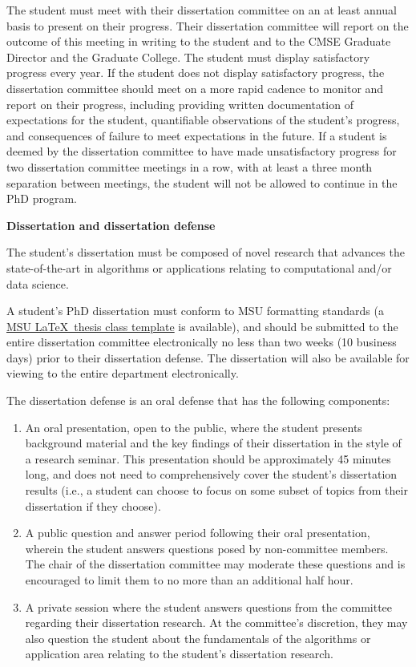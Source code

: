 The student must meet with their dissertation committee on an at least
annual basis to present on their progress.  Their dissertation
committee will report on the outcome of this meeting in writing to the
student and to the CMSE Graduate Director and the Graduate College.
The student must display satisfactory progress every year.  If the
student does not display satisfactory progress, the dissertation
committee should meet on a more rapid cadence to monitor and report on
their progress, including providing written documentation of
expectations for the student, quantifiable observations of the
student's progress, and consequences of failure to meet expectations
in the future.  If a student is deemed by the dissertation committee
to have made unsatisfactory progress for two dissertation committee
meetings in a row, with at least a three month separation between
meetings, the student will not be allowed to continue in the PhD
program.

\vspace{3mm}
\noindent
\textbf{Dissertation and dissertation defense}

The student's dissertation must be composed of novel research that
advances the state-of-the-art in algorithms or applications relating
to computational and/or data science.

A student's PhD dissertation must conform to MSU formatting standards
(a \href{http://ctan.org/pkg/msu-thesis}{MSU \LaTeX\ thesis class
  template} is available), and should be submitted to the entire
dissertation committee electronically no less than two weeks (10 business days) prior to
their dissertation defense.  The dissertation will also be available for
viewing to the entire department electronically.

The dissertation defense is an oral defense that has the following
components:

\begin{enumerate}

\item An oral presentation, open to the public, where the student
  presents background material and the key findings of their
  dissertation in the style of a research seminar.  This presentation
  should be approximately 45 minutes long, and does not need to
  comprehensively cover the student's dissertation results (i.e., a
  student can choose to focus on some subset of topics from their
  dissertation if they choose).

\item A public question and answer period following their oral
  presentation, wherein the student answers questions posed by
  non-committee members.  The chair of the dissertation committee may
  moderate these questions and is encouraged to limit them to no more
  than an additional half hour.

\item A private session where the student answers questions from the
  committee regarding their dissertation research.  At the committee's
  discretion, they may also question the student about the
  fundamentals of the algorithms or application area relating to the
  student's dissertation research.

\end{enumerate}

